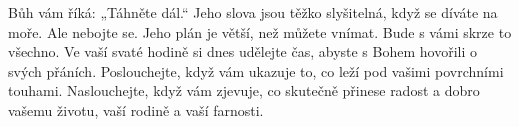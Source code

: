 \documentclass[11pt]{article}
\begin{document}
Bůh vám říká: „Táhněte dál.“ Jeho slova jsou těžko slyšitelná, když se díváte na moře. Ale nebojte se. Jeho plán je
větší, než můžete vnímat. Bude s vámi skrze to všechno. Ve vaší svaté hodině si dnes udělejte čas, abyste s Bohem
hovořili o svých přáních. Poslouchejte, když vám ukazuje to, co leží pod vašimi povrchními touhami. Naslouchejte,
když vám zjevuje, co skutečně přinese radost a dobro vašemu životu, vaší rodině a vaší farnosti.
\end{document}
